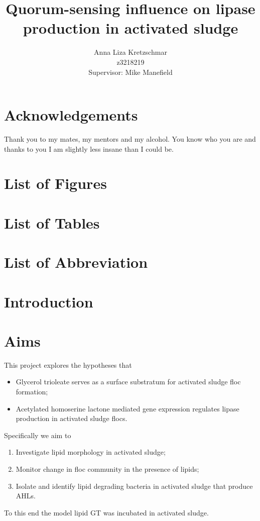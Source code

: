 \documentclass{article}
\title{\textbf{Quorum-sensing influence on lipase production in activated sludge}}
\author{Anna Liza Kretzschmar\\
        z3218219\\
        Supervisor: Mike Manefield}
\date{}
\begin{document}
\maketitle

\tableofcontents

\newpage


\section{Acknowledgements}
Thank you to my mates, my mentors and my alcohol. You know who you are and thanks to you I am slightly less insane than I could be.
\newpage
\section{List of Figures}

\newpage
\section{List of Tables}

\newpage
\section{List of Abbreviation}

%

\newpage
\section{Introduction}



\section{Aims}
This project explores the hypotheses that 
\begin{itemize}
\item Glycerol trioleate serves as a surface substratum for activated sludge floc formation;
\item Acetylated homoserine lactone mediated gene expression regulates lipase production in activated sludge flocs.
\end{itemize}

\noindent
Specifically we aim to

\begin{enumerate}
\item Investigate lipid morphology in activated sludge;
\item Monitor change in floc community in the presence of lipids;
\item Isolate and identify lipid degrading bacteria in activated sludge that produce AHLs.
\end{enumerate}
To this end the model lipid GT was incubated in activated sludge.
\end{document}
